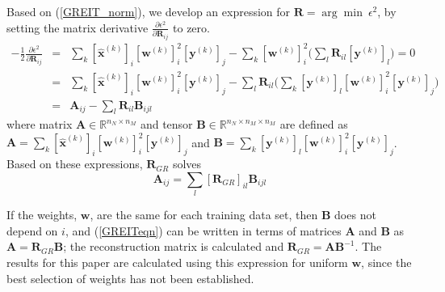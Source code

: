 \documentclass[12pt]{iopart}
\newcommand{\xH}{\mbox{$\mathbf{\hat x}$}}
\newcommand{\yB}{\mbox{$\mathbf{y}$}}
\newcommand{\wB}{\mbox{$\mathbf{w}$}}
\newcommand{\AB}{\mbox{$\mathbf{A}$}}
\newcommand{\BB}{\mbox{$\mathbf{B}$}}
\newcommand{\RB}{\mbox{$\mathbf{R}$}}
\begin{document}
Based on (\ref{GREIT_norm}), we develop an expression
for $\RB = \arg\min~\epsilon^2$, by setting the
matrix derivative 
$\frac{\partial \epsilon^2}
     {\partial \RB_{ij} }$ to zero.
\begin{eqnarray}
-\mbox{$\frac{1}{2}$}
\frac{ \partial \epsilon^2 }
     { \partial \RB_{ij} }
 &=&
   \sum_k [\xH^{(k)}]_{i}  [\wB^{(k)}]_i^2 [\yB^{(k)}]_j 
  -\sum_k                  [\wB^{(k)}]_i^2
         \Big( \sum_l \RB_{il} [\yB^{(k)}]_l \Big) = 0
\nonumber \\
 &=&
   \sum_k [\xH^{(k)}]_{i}  [\wB^{(k)}]_i^2 [\yB^{(k)}]_j 
  -\sum_l \RB_{il} 
         \Big( \sum_k [\yB^{(k)}]_l [\wB^{(k)}]_i^2 [\yB^{(k)}]_j \Big)
\nonumber \\
 &=& 
   \AB_{ij}
  -\sum_l \RB_{il} \BB_{ijl}
\end{eqnarray}
where matrix $\AB \in \mathbb{R}^{n_N \times n_M}$
and tensor $\BB \in \mathbb{R}^{n_N \times n_M \times n_M}$
are defined as
$\AB = 
   \sum_k [\xH^{(k)}]_{i}  [\wB^{(k)}]_i^2 [\yB^{(k)}]_j $
and 
$\BB = 
   \sum_k [\yB^{(k)}]_l [\wB^{(k)}]_i^2 [\yB^{(k)}]_j $.
Based on these expressions, $\RB_{GR}$ solves
\begin{equation}
\label{GREITeqn}
\AB_{ij} = \sum_l [\RB_{GR}]_{il} \BB_{ijl}
\end{equation}

If the weights, $\wB$, are the same for each training
data set, then $\BB$ does not depend on $i$, and
(\ref{GREITeqn}) can be written in terms of
matrices $\AB$ and $\BB$ as $\AB = \RB_{GR} \BB$;
the reconstruction matrix is calculated
and $\RB_{GR} = \AB \BB^{-1}$. The results for this paper
are calculated using this expression for uniform $\wB$,
since the best selection of weights has not been established.
\end{document}
